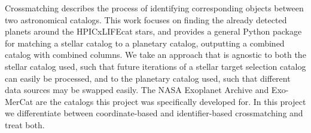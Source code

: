  Crossmatching describes the process of identifying corresponding objects between two astronomical catalogs. This work focuses on finding the already detected planets around the HPICxLIFEcat stars, and provides a general Python package for matching a stellar catalog to a planetary catalog, outputting a combined catalog with combined columns. We take an approach that is agnostic to both the stellar catalog used, such that future iterations of a stellar target selection catalog can easily be processed, and to the planetary catalog used, such that different data sources may be swapped easily. The NASA Exoplanet Archive \cite{NasaExoplanetArchive} and Exo-MerCat \cite{Alei_2020, Alei_2025} are the catalogs this project was specifically developed for. In this project we differentiate between coordinate-based and identifier-based crossmatching and treat both.
